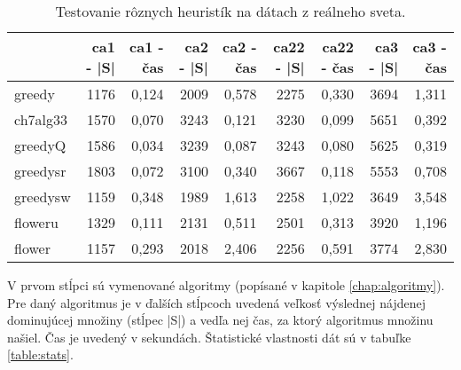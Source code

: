 \begin{table}[h]
	\centering
	\caption{Testovanie rôznych heuristík na dátach z reálneho sveta.}
	\begin{tabular}{l|rrrrrrrr}
		\hline
		         & ca1 - |S| & ca1 - čas & ca2 - |S| & ca2 - čas & ca22 - |S| & ca22 - čas & ca3 - |S| & ca3 - čas \\ \hline
		greedy   & 1176      & 0,124     & 2009      & 0,578     & 2275       & 0,330      & 3694      & 1,311     \\
		ch7alg33 & 1570      & 0,070     & 3243      & 0,121     & 3230       & 0,099      & 5651      & 0,392     \\
		greedyQ  & 1586      & 0,034     & 3239      & 0,087     & 3243       & 0,080      & 5625      & 0,319     \\
		greedysr & 1803      & 0,072     & 3100      & 0,340     & 3667       & 0,118      & 5553      & 0,708     \\
		greedysw & 1159      & 0,348     & 1989      & 1,613     & 2258       & 1,022      & 3649      & 3,548     \\
		floweru  & 1329      & 0,111     & 2131      & 0,511     & 2501       & 0,313      & 3920      & 1,196     \\
		flower   & 1157      & 0,293     & 2018      & 2,406     & 2256       & 0,591      & 3774      & 2,830     \\ \hline
	\end{tabular}
	\bigskip\par
	V prvom stĺpci sú vymenované algoritmy (popísané v kapitole 
	\ref{chap:algoritmy}). Pre daný algoritmus je v ďalších stĺpcoch uvedená 
	veľkosť výslednej nájdenej dominujúcej množiny (stĺpec |S|) a vedľa nej 
	čas, za ktorý algoritmus množinu našiel. Čas je uvedený v sekundách. 
	Štatistické vlastnosti dát sú v tabuľke \ref{table:stats}.
	\label{table:real}
\end{table}

